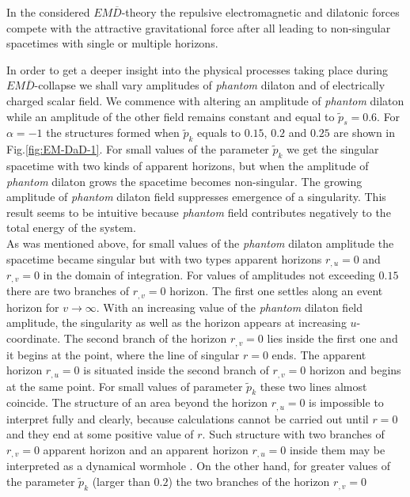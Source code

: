 \documentclass[aps,showpacs,nofootinbib,floatfix]{revtex4}
\newcommand{\tpe}{{\tilde p}}
\begin{document}
In the considered $EM\overline{D}$-theory the repulsive electromagnetic and dilatonic forces compete with 
the attractive gravitational force after all leading to non-singular spacetimes 
with single or multiple horizons.
\par
In order to get a deeper insight into the physical processes taking place during $EM\overline{D}$-collapse
we shall vary amplitudes of {\it phantom} dilaton and of electrically charged scalar field.
We commence with altering an amplitude of {\it phantom} dilaton 
while an amplitude of the other field remains constant and equal to $\tpe_s=0.6$.
For $\alpha=-1$ the structures formed when $\tpe_k$ equals to $0.15$, $0.2$ and $0.25$ are shown 
in Fig.\ref{fig:EM-DaD-1}. For small values of the parameter $\tpe_k$ we get the singular spacetime 
with two kinds of apparent horizons, but
when the amplitude of {\it phantom} dilaton grows the spacetime becomes non-singular. 
The growing amplitude of {\it phantom} dilaton field suppresses emergence of a singularity. 
This result seems to be intuitive because {\it phantom} field contributes negatively to the total energy of the system.\\
As was mentioned above, for small values of the {\it phantom} dilaton amplitude the spacetime became
singular but with two types apparent horizons $r_{,u}=0$ and $r_{,v}=0$ in the domain of integration.
For values of amplitudes not exceeding $0.15$ there are two branches of $r_{,v}=0$ horizon.
The first one settles along an event horizon for $v\rightarrow\infty$. 
With an increasing value of the {\it phantom}
dilaton field amplitude, the singularity as well as the horizon appears at increasing $u$-coordinate. The 
second branch of the horizon $r_{,v}=0$ lies inside the first one and it begins at the point, where the 
line of singular $r=0$ ends. The apparent horizon $r_{,u}=0$ is situated inside the second 
branch of $r_{,v}=0$ horizon and begins at the same point. For small values of parameter 
$\tpe_k$ these two lines almost coincide. The structure of an area beyond the horizon 
$r_{,u}=0$ is impossible to interpret fully and clearly, because calculations cannot be 
carried out until $r=0$ and they end at some positive value of $r$. Such structure with 
two branches of $r_{,v}=0$ apparent horizon and an apparent horizon $r_{,u}=0$ inside them 
may be interpreted as a dynamical wormhole \cite{hwa11}. On the other hand,
for greater
values of the parameter $\tpe_k$ (larger than $0.2$) the two branches of the horizon $r_{,v}=0$ 
\end{document}
